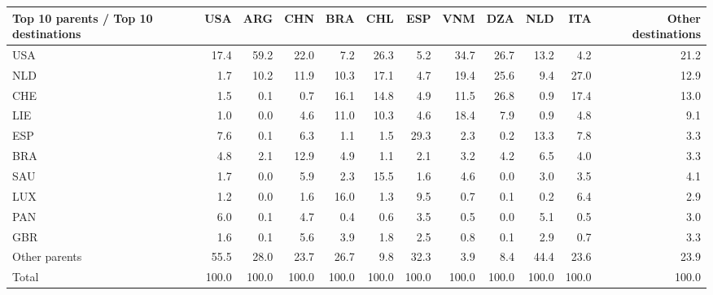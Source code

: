 \begin{tabular}{lrrrrrrrrrrr}
\toprule
Top 10 parents / Top 10 destinations & USA & ARG & CHN & BRA & CHL & ESP & VNM & DZA & NLD & ITA & Other destinations \\
\midrule
USA & 17.4 & 59.2 & 22.0 & 7.2 & 26.3 & 5.2 & 34.7 & 26.7 & 13.2 & 4.2 & 21.2 \\
NLD & 1.7 & 10.2 & 11.9 & 10.3 & 17.1 & 4.7 & 19.4 & 25.6 & 9.4 & 27.0 & 12.9 \\
CHE & 1.5 & 0.1 & 0.7 & 16.1 & 14.8 & 4.9 & 11.5 & 26.8 & 0.9 & 17.4 & 13.0 \\
LIE & 1.0 & 0.0 & 4.6 & 11.0 & 10.3 & 4.6 & 18.4 & 7.9 & 0.9 & 4.8 & 9.1 \\
ESP & 7.6 & 0.1 & 6.3 & 1.1 & 1.5 & 29.3 & 2.3 & 0.2 & 13.3 & 7.8 & 3.3 \\
BRA & 4.8 & 2.1 & 12.9 & 4.9 & 1.1 & 2.1 & 3.2 & 4.2 & 6.5 & 4.0 & 3.3 \\
SAU & 1.7 & 0.0 & 5.9 & 2.3 & 15.5 & 1.6 & 4.6 & 0.0 & 3.0 & 3.5 & 4.1 \\
LUX & 1.2 & 0.0 & 1.6 & 16.0 & 1.3 & 9.5 & 0.7 & 0.1 & 0.2 & 6.4 & 2.9 \\
PAN & 6.0 & 0.1 & 4.7 & 0.4 & 0.6 & 3.5 & 0.5 & 0.0 & 5.1 & 0.5 & 3.0 \\
GBR & 1.6 & 0.1 & 5.6 & 3.9 & 1.8 & 2.5 & 0.8 & 0.1 & 2.9 & 0.7 & 3.3 \\
Other parents & 55.5 & 28.0 & 23.7 & 26.7 & 9.8 & 32.3 & 3.9 & 8.4 & 44.4 & 23.6 & 23.9 \\
\midrule
Total & 100.0 & 100.0 & 100.0 & 100.0 & 100.0 & 100.0 & 100.0 & 100.0 & 100.0 & 100.0 & 100.0 \\
\bottomrule
\end{tabular}
